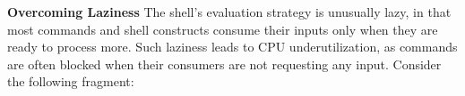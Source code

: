 \documentclass[sigplan, review, screen, anonymous]{acmart}
\newcommand{\heading}[1]{\vspace{4pt}\noindent\textbf{#1}\enspace}
\newcommand{\nv}[1]{[{\color{cyan}nv: #1}]}
\newcommand{\kk}[1]{[{\color{magenta}kk: #1}]}
\newcommand{\unix}{{\scshape Unix}\xspace}
\begin{document}
% 
% 
% 
% 
% 
%




\heading{Overcoming Laziness}
The shell's evaluation strategy is unusually lazy, in that most commands and shell constructs consume their inputs only when they are ready to process more.
Such laziness leads to CPU underutilization, as commands are often blocked when their consumers are not requesting any input.
Consider the following fragment:
\end{document}
